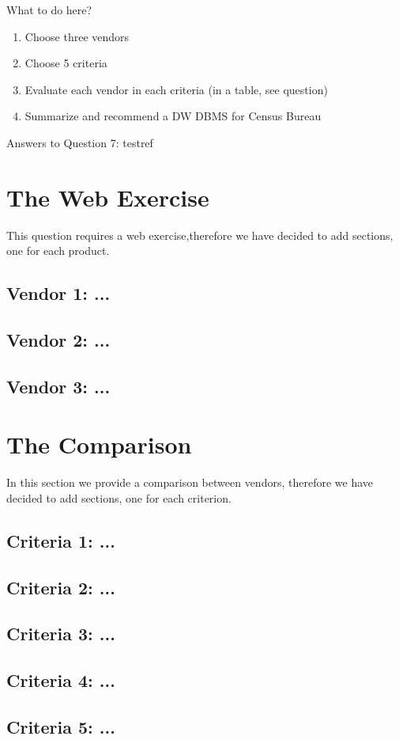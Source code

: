 What to do here?
\begin{enumerate}
    \item Choose three vendors
    \item Choose 5 criteria
    \item Evaluate each vendor in each criteria (in a table, see question)
    \item Summarize and recommend a DW DBMS for Census Bureau
  \end{enumerate}
\newpage Answers to Question 7:
testref \cite{benchmark}
\section{The Web Exercise}
This question requires a web exercise,therefore we have decided to add sections, one for each product. 

\subsection{Vendor 1: ...}
    
\subsection{Vendor 2: ...}
    
\subsection{Vendor 3: ...}

\section{The Comparison}
In this section we provide a comparison between vendors, therefore we have decided to add sections, one for each criterion. 

\subsection{Criteria 1: ...}
    
\subsection{Criteria 2: ...}
    
\subsection{Criteria 3: ...}

\subsection{Criteria 4: ...}

\subsection{Criteria 5: ...}

